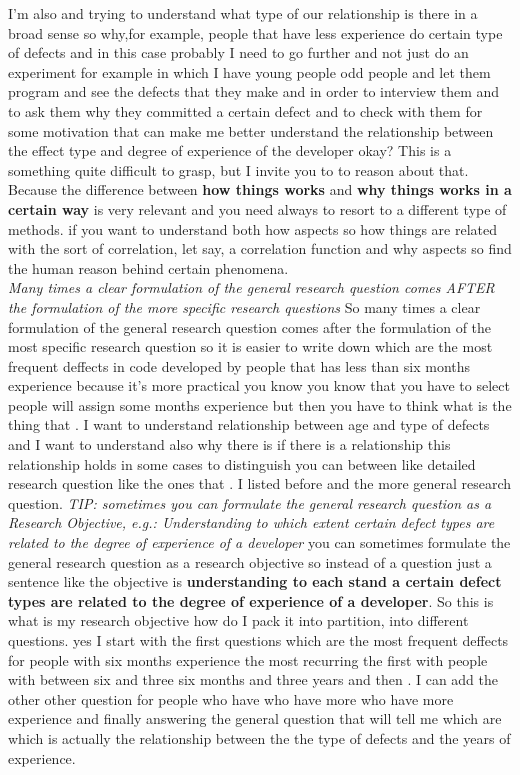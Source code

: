 \documentclass[conference, compsoc, twoside]{IEEEtran}
\begin{document}
I'm also and trying to understand what type of our relationship is there in a broad sense so why,for example, people that have less experience do certain type of defects and in this case probably I need to go further and not just do an experiment for example in which I have young people odd people and let them program and see the defects that they make and in order to interview them and to ask them why they committed a certain defect and to check with them for some motivation that can make me better understand the relationship between the effect type and degree of experience of the developer okay?
This is a something quite difficult to grasp, but I invite you to to reason about that. 
Because the difference between \textbf{how things works} and \textbf{why things works in a certain way} is very relevant and you need always to resort to a different type of methods.
if you want to understand both how aspects so how things are related with the sort of correlation, let say, a correlation function and why aspects so find the human reason behind certain phenomena.
\\
\textit{Many times a clear formulation of the general research question comes AFTER the formulation of the more specific research questions}
So many times a clear formulation of the general research question comes after the formulation of the most specific research question so it is easier to write down which are the most frequent deffects in code developed by people that has less than six months experience because it's more practical you know you know that you have to select people will assign some months experience but then you have to think what is the thing that .
I want to understand relationship between age and type of defects and I want to understand also why there is if there is a relationship this relationship holds in some cases to distinguish you can between like detailed research question like the ones that .
I listed before and the more general research question. 
\textit{TIP: sometimes you can formulate the general research question as a Research Objective, e.g.: Understanding to which extent certain defect types are related to the degree of experience of a developer}
you can sometimes formulate the general research question as a research objective so instead of a question just a sentence like the objective is \textbf{understanding to each stand a certain defect types are related to the degree of experience of a developer}. 
So this is what is my research objective how do I pack it into partition, into different questions.
yes I start with the first questions which are the most frequent deffects for people with six months experience the most recurring the first with people with between six and three six months and three years and then .
I can add the other other question for people who have who have more who have more experience and finally answering the general question that will tell me which are which is actually the relationship between the the type of defects and the years of experience.
\end{document}
